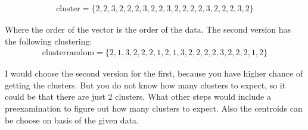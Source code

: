 \begin{align*}
\text{cluster} = \{2,2,3,2,2,2,3,2,2,3,2,2,2,2,3,2,2,2,3,2\} 
\end{align*}

Where the order of the vector is the order of the data. The second version has
the following clustering:
\begin{align*}
\text{clusterrandom} =\{ 2,1,3,2,2,2,1,2,1,3,2,2,2,2,3,2,2,2,1,2\}
\end{align*}

I would choose the second version for the first, because you have higher chance
of getting the clusters. But you do not know how many clusters to expect, so it
could be that there are just 2 clusters. What other steps would include a
preexamination to figure out how many clusters to expect. Also the centroids can
be choose on basis of the given data.


